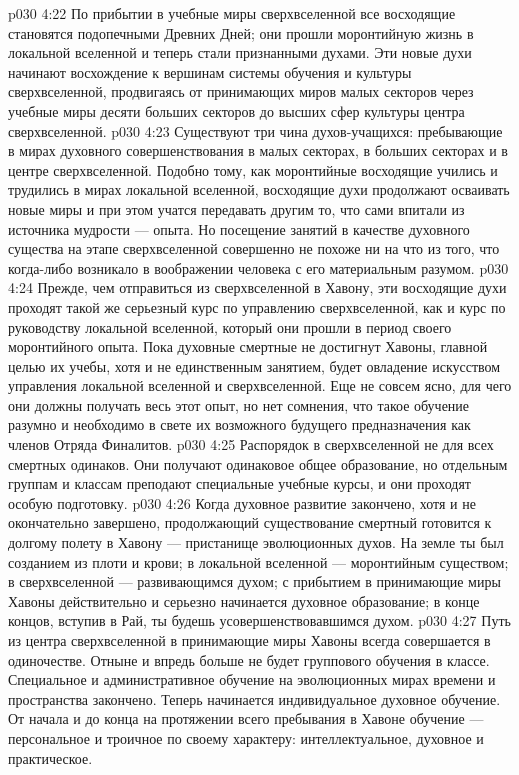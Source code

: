 \vs p030 4:22 \pc {}\bibnobreakspace {} По прибытии в учебные миры сверхвселенной все восходящие становятся подопечными Древних Дней; они прошли моронтийную жизнь в локальной вселенной и теперь стали признанными духами. Эти новые духи начинают восхождение к вершинам системы обучения и культуры сверхвселенной, продвигаясь от принимающих миров малых секторов через учебные миры десяти больших секторов до высших сфер культуры центра сверхвселенной.
\vs p030 4:23 Существуют три чина духов\hyp{}учащихся: пребывающие в мирах духовного совершенствования в малых секторах, в больших секторах и в центре сверхвселенной. Подобно тому, как моронтийные восходящие учились и трудились в мирах локальной вселенной, восходящие духи продолжают осваивать новые миры и при этом учатся передавать другим то, что сами впитали из источника мудрости --- опыта. Но посещение занятий в качестве духовного существа на этапе сверхвселенной совершенно не похоже ни на что из того, что когда\hyp{}либо возникало в воображении человека с его материальным разумом.
\vs p030 4:24 Прежде, чем отправиться из сверхвселенной в Хавону, эти восходящие духи проходят такой же серьезный курс по управлению сверхвселенной, как и курс по руководству локальной вселенной, который они прошли в период своего моронтийного опыта. Пока духовные смертные не достигнут Хавоны, главной целью их учебы, хотя и не единственным занятием, будет овладение искусством управления локальной вселенной и сверхвселенной. Еще не совсем ясно, для чего они должны получать весь этот опыт, но нет сомнения, что такое обучение разумно и необходимо в свете их возможного будущего предназначения как членов Отряда Финалитов.
\vs p030 4:25 Распорядок в сверхвселенной не для всех смертных одинаков. Они получают одинаковое общее образование, но отдельным группам и классам преподают специальные учебные курсы, и они проходят особую подготовку.
\vs p030 4:26 \pc {}\bibnobreakspace {} Когда духовное развитие закончено, хотя и не окончательно завершено, продолжающий существование смертный готовится к долгому полету в Хавону --- пристанище эволюционных духов. На земле ты был созданием из плоти и крови; в локальной вселенной --- моронтийным существом; в сверхвселенной --- развивающимся духом; с прибытием в принимающие миры Хавоны действительно и серьезно начинается духовное образование; в конце концов, вступив в Рай, ты будешь усовершенствовавшимся духом.
\vs p030 4:27 Путь из центра сверхвселенной в принимающие миры Хавоны всегда совершается в одиночестве. Отныне и впредь больше не будет группового обучения в классе. Специальное и административное обучение на эволюционных мирах времени и пространства закончено. Теперь начинается  индивидуальное духовное обучение. От начала и до конца на протяжении всего пребывания в Хавоне обучение --- персональное и троичное по своему характеру: интеллектуальное, духовное и практическое.
